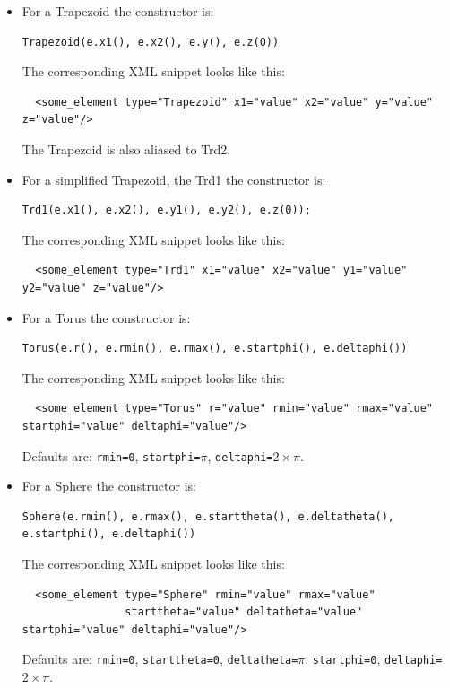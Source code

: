 \begin{itemize}
\item For a Trapezoid the constructor is:
\begin{verbatim}
Trapezoid(e.x1(), e.x2(), e.y(), e.z(0))
\end{verbatim}
The corresponding XML snippet looks like this:
\begin{verbatim}
  <some_element type="Trapezoid" x1="value" x2="value" y="value" z="value"/>
\end{verbatim}
The Trapezoid is also aliased to Trd2.

\item For a simplified Trapezoid, the Trd1 the constructor is:
\begin{verbatim}
Trd1(e.x1(), e.x2(), e.y1(), e.y2(), e.z(0));
\end{verbatim}
The corresponding XML snippet looks like this:
\begin{verbatim}
  <some_element type="Trd1" x1="value" x2="value" y1="value" y2="value" z="value"/>
\end{verbatim}

\item For a Torus the constructor is:
\begin{verbatim}
Torus(e.r(), e.rmin(), e.rmax(), e.startphi(), e.deltaphi())
\end{verbatim}
The corresponding XML snippet looks like this:
\begin{verbatim}
  <some_element type="Torus" r="value" rmin="value" rmax="value" startphi="value" deltaphi="value"/>
\end{verbatim}
Defaults are: \texttt{rmin=0},  \texttt{startphi=$\pi$},  \texttt{deltaphi=$2\times\pi$}.

\item For a Sphere the constructor is:
\begin{verbatim}
Sphere(e.rmin(), e.rmax(), e.starttheta(), e.deltatheta(), e.startphi(), e.deltaphi())
\end{verbatim}
The corresponding XML snippet looks like this:
\begin{verbatim}
  <some_element type="Sphere" rmin="value" rmax="value"
                starttheta="value" deltatheta="value" startphi="value" deltaphi="value"/>
\end{verbatim}
Defaults are: \texttt{rmin=0},  \texttt{starttheta=0},  \texttt{deltatheta=$\pi$},
\texttt{startphi=0}, \texttt{deltaphi=$2\times\pi$}.


\end{itemize}
